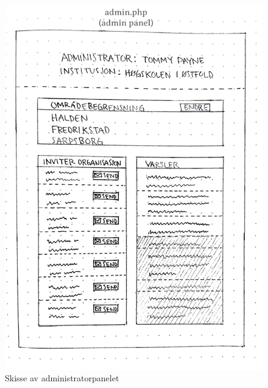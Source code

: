 \begin{figure}[H]
\centering
\includegraphics[width=.9\textwidth]{Illustrasjoner/Skisser-pdf/1.0/1-22-adminpanel.pdf}
\caption{Skisse av administratorpanelet}
\label{vedlegg:1-22-admin}
\end{figure}